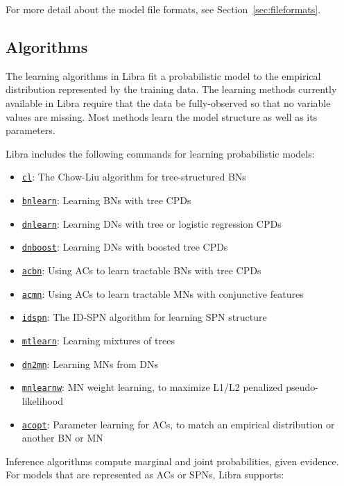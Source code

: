 \documentclass[11pt]{article}
\newcommand{\compactlist}{
  \setlength{\itemsep}{1pt}
  \setlength{\parskip}{0pt}
  \setlength{\parsep}{0pt}
}
\begin{document}
For more detail about the model file formats, see
Section~\ref{sec:fileformats}.

\subsection{Algorithms}

The learning algorithms in Libra fit a probabilistic model to the
empirical distribution represented by the training data.  The learning
methods currently available in Libra require that the data be
fully-observed so that no variable values are missing.  Most methods
learn the model structure as well as its parameters.

Libra includes the following commands for learning
probabilistic models:
\begin{itemize}
\compactlist
\item \hyperref[sec:cl]{{\tt cl}}: The Chow-Liu algorithm for tree-structured BNs~\cite{chow&liu68}
\item \hyperref[sec:bnlearn]{{\tt bnlearn}}: Learning BNs with tree CPDs~\cite{chickering&al97}
\item \hyperref[sec:dnlearn]{{\tt dnlearn}}: Learning DNs with tree or logistic regression CPDs~\cite{heckerman&al00}
\item \hyperref[sec:dnboost]{{\tt dnboost}}: Learning DNs with boosted tree CPDs
\item \hyperref[sec:acbn]{{\tt acbn}}: Using ACs to learn tractable BNs with tree CPDs~\cite{lowd&domingos08}
\item \hyperref[sec:acmn]{{\tt acmn}}: Using ACs to learn tractable MNs with conjunctive features~\cite{lowd&rooshenas13}
\item \hyperref[sec:idspn]{{\tt idspn}}: The ID-SPN algorithm for learning SPN structure~\cite{rooshenas&lowd14}
\item \hyperref[sec:mtlearn]{{\tt mtlearn}}: Learning mixtures of trees~\cite{meila&jordan00}
\item \hyperref[sec:dn2mn]{{\tt dn2mn}}: Learning MNs from DNs~\cite{lowd12}
\item \hyperref[sec:mnlearnw]{{\tt mnlearnw}}: MN weight learning, to maximize L1/L2 penalized pseudo-likelihood
\item \hyperref[sec:acopt]{{\tt acopt}}: Parameter learning for ACs, to match an empirical
  distribution or another BN or MN~\cite{lowd&domingos10}
\end{itemize}
Inference algorithms compute marginal and joint probabilities, given
evidence.
For models that are represented as ACs or SPNs, Libra supports:
\end{document}
